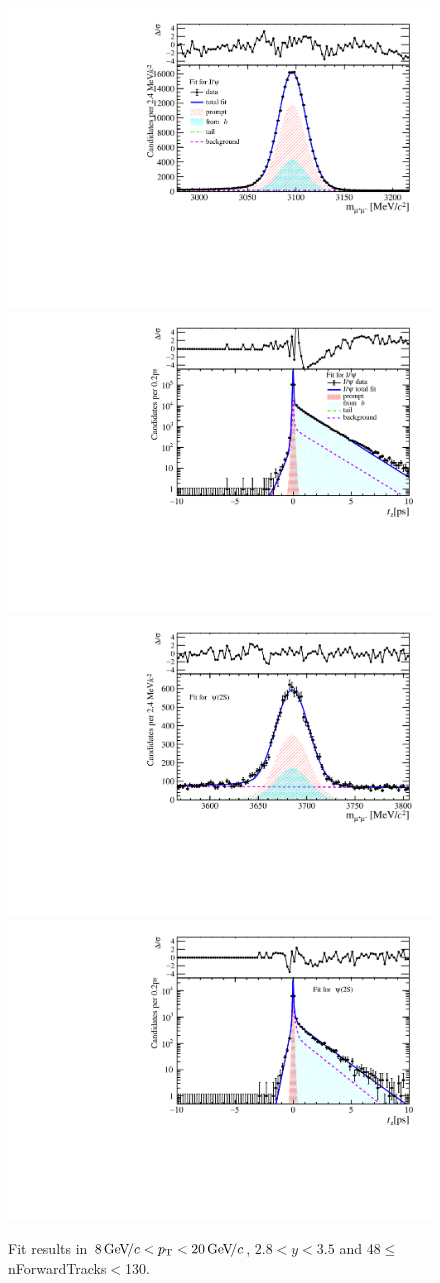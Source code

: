\begin{figure}[H]
\begin{center}
\includegraphics[width=0.47\linewidth]{pdf/Jpsi/drawmassF/n5y2pt5.pdf}
\includegraphics[width=0.47\linewidth]{pdf/Jpsi/2DFitF/n5y2pt5.pdf}
\vspace*{-0.5cm}
\includegraphics[width=0.47\linewidth]{pdf/Psi2S/drawmassF/n5y2pt5.pdf}
\includegraphics[width=0.47\linewidth]{pdf/Psi2S/2DFitF/n5y2pt5.pdf}
\vspace*{-0.5cm}
\end{center}
\caption{Fit results in $8\text{\,Ge\kern -0.1em V\!/}c<p_{\mathrm{T}}<20\text{\,Ge\kern -0.1em V\!/}c$, $2.8<y<3.5$ and 48$\leq$nForwardTracks$<$130.}
\label{Fitn5y2pt5}
\end{figure}
